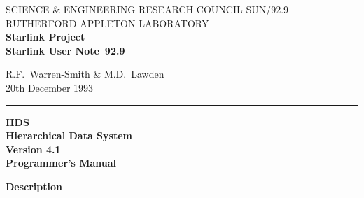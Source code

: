 \pagestyle{headings}

\newcommand{\stardoccategory}  {Starlink User Note}
\newcommand{\stardocinitials}  {SUN}
\newcommand{\stardocnumber}    {92.9}
\newcommand{\stardocauthors}   {R.F.~Warren-Smith \& M.D.~Lawden}
\newcommand{\stardocdate}      {20th December 1993}
\newcommand{\stardoctitle}     {HDS\\ [1ex]
                                Hierarchical Data System}
\newcommand{\stardocversion}   {Version 4.1}
\newcommand{\stardocmanual}    {Programmer's Manual}

\newcommand{\stardocname}{\stardocinitials /\stardocnumber}
\markright{\stardocname}
\setlength{\textwidth}{160mm}
\setlength{\textheight}{230mm}
\setlength{\topmargin}{-2mm}
\setlength{\oddsidemargin}{0mm}
\setlength{\evensidemargin}{0mm}
\setlength{\parindent}{0mm}
\setlength{\parskip}{\medskipamount}
\setlength{\unitlength}{1mm}

\renewcommand{\_}{{\tt\char'137}}
\renewcommand{\thepage}{\roman{page}}



\thispagestyle{empty}
SCIENCE \& ENGINEERING RESEARCH COUNCIL \hfill \stardocname\\
RUTHERFORD APPLETON LABORATORY\\
{\large\bf Starlink Project\\}
{\large\bf \stardoccategory\ \stardocnumber}
\begin{flushright}
\stardocauthors\\
\stardocdate
\end{flushright}
\vspace{-4mm}
\rule{\textwidth}{0.5mm}
\vspace{5mm}
\begin{center}
{\Huge\bf  \stardoctitle \\ [2.5ex]}
{\LARGE\bf \stardocversion \\ [4ex]}
{\Huge\bf  \stardocmanual}
\end{center}
\vspace{15mm}

\begin{center}
{\Large\bf Description}
\end{center}

